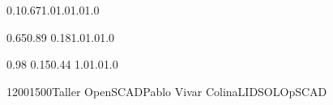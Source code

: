 \documentclass[a4paper,10pt]{report}
\begin{document}
 \thispagestyle{empty}
 \begin{landscape}
 
 \setslotsize{2.8cm}{0.25cm}
 \settextframe{1.0mm}
 
 
 
 
   {0.1}{0.67}{1.0}{1.0}{1.0}{1.0}   
 
        {0.65}{0.89} {0.18}{1.0}{1.0}{1.0}

 
 
 
 
   {0.98} {0.15}{0.44} {1.0}{1.0}{1.0}
 

 
 
 \begin{timetable}
 

 
   
   
   
   
   
    
  
     {1200}{1500}{Taller OpenSCAD}{Pablo Vivar Colina}{{\tiny LIDSOL}}{OpSCAD}
   

\end{timetable}
\end{landscape}
\end{document}
